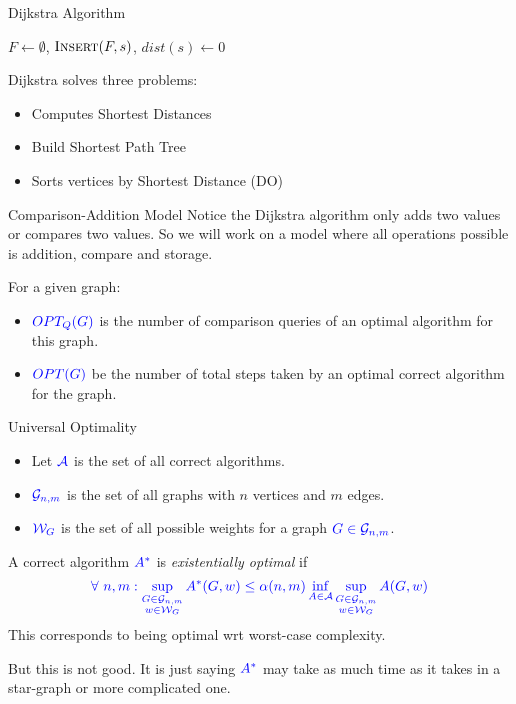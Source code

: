 \documentclass[10pt]{beamer}
\begin{document}
\begin{frame}{Dijkstra Algorithm}

	\begin{algorithm}[H]
		\DontPrintSemicolon
		$F\longleftarrow \emptyset$, $\textsc{Insert}(F,s)$, 	$dist(s)\longleftarrow 0$\;
		\caption{\textsc{Dijkstra}$(G,s,w)$}
	\end{algorithm}\pause
	Dijkstra solves three problems:
	\begin{itemize}
		\item  Computes Shortest Distances\pause
		\item  Build Shortest Path Tree\pause
		\item Sorts vertices by Shortest Distance (DO)
	\end{itemize}
\end{frame}
\begin{frame}{Comparison-Addition Model}
	Notice the Dijkstra algorithm only adds two values or compares two values. So we will work on a model where all operations possible is addition, compare and storage. \vfill\pause

	For a given graph:
	\begin{itemize}
		\item $\mathcolor{blue}{OPT_Q(G)}$ is the number of comparison queries of an optimal algorithm for this graph.\vfill
		\item $\mathcolor{blue}{OPT(G)}$ be the number of total steps taken by an optimal correct algorithm for the graph.
	\end{itemize}

\end{frame}
\begin{frame}{Universal Optimality}
	\begin{itemize}
		\item Let $\mathcolor{blue}{\mathcal{A}}$ is the set of all correct algorithms.
		\item $\mathcolor{blue}{\mathcal{G}_{n,m}}$ is the set of all graphs with $n$ vertices and $m$ edges.
		\item $\mathcolor{blue}{\mathcal{W}_G}$ is the set of all possible weights for a graph $\mathcolor{blue}{G\in\mathcal{G}_{n,m}}$.
	\end{itemize} \pause\vfill
	A correct algorithm $\mathcolor{blue}{A^*}$ is \emph{existentially optimal} if $$\mathcolor{blue}{\forall\ n,m: \sup\limits_{\substack{G\in\mathcal{G}_{n,m}\\ w\in \mathcal{W}_G} }A^*(G,w)\leq \alpha(n,m)\inf\limits_{A\in \mathcal{A}}\sup\limits_{\substack{G\in\mathcal{G}_{n,m}\\ w\in \mathcal{W}_G} } A(G,w)}$$This corresponds to being optimal wrt worst-case complexity.\pause  \vfill

	But this is not good. It is just saying $\mathcolor{blue}{A^*}$ may take as much time as it takes in a star-graph or more complicated one.
\end{frame}
\end{document}
